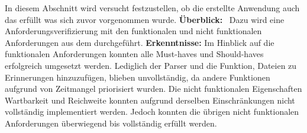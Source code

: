 %
In diesem Abschnitt wird versucht festzustellen, ob die erstellte Anwendung auch das erfüllt was sich zuvor vorgenommen wurde.\newline%
%
\textbf{Überblick:} %
Dazu wird eine Anforderungsverifizierung mit den funktionalen und nicht funktionalen Anforderungen aus dem  durchgeführt.\newline%
%
\textbf{Erkenntnisse:}\newline%
	Im Hinblick auf die funktionalen Anforderungen konnten alle \glqq Must-haves\grqq{} und \glqq Should-haves\grqq{} erfolgreich umgesetzt werden. Lediglich der Parser und die Funktion, Dateien zu Erinnerungen hinzuzufügen, blieben unvollständig, da andere Funktionen aufgrund von Zeitmangel priorisiert wurden. %
	Die nicht funktionalen Eigenschaften \glqq Wartbarkeit\grqq{} und \glqq Reichweite\grqq{} konnten aufgrund derselben Einschränkungen nicht vollständig implementiert werden. Jedoch konnten die übrigen nicht funktionalen Anforderungen überwiegend bis vollständig erfüllt werden.%
%
%
%
%	
%
